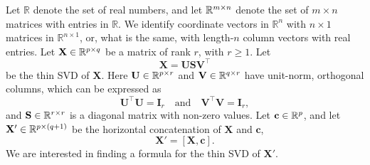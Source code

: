 \documentclass[11pt,a4paper]{article}
\theoremstyle{mybreak}
\numberwithin{dummy}{section}
\theoremstyle{plain}
\theoremstyle{plain}
\theoremstyle{plain}
\theoremstyle{plain}
\theoremstyle{MyNonumberplain}
\newcommand{\0}{\M{0}}
\newcommand{\M}[1]{\mathbf{#1}}
\newcommand{\R}{\mathbb{R}}
\newcommand{\T}{\top}
\newcommand{\ve}[1]{\mathbf{#1}}
\newcommand{\Mat}[2]{%
  \ifthenelse{\equal{#2}{1}}
  {\R^{#1}}
  {\R^{#1 \times #2}}
}
\begin{document}
Let $\R$ denote the set of real numbers, and let $\Mat{m}{n}$ denote the set of $m \times n$ matrices with entries in $\R$.  We identify coordinate vectors in $\R^n$ with $n \times 1$ matrices in $\R^{n \times 1}$, or, what is the same, with length-$n$ column vectors with real entries.  Let $\M{X} \in \Mat{p}{q}$ be a matrix of rank $r$, with $r \geq 1$. Let
\begin{equation}
  \label{eq:1}
  \M{X} = \M{U} \M{S} \M{V}^\T
\end{equation}
be the thin SVD of $\M{X}$.  Here $\M{U} \in \Mat{p}{r}$ and $\M{V} \in \Mat{q}{r}$ have unit-norm, orthogonal columns, which can be expressed as
\begin{displaymath}
  \M{U}^\T \M{U} = \M{I}_r
  \quad
  \text{and}
  \quad
  \M{V}^\T \M{V} = \M{I}_r,
\end{displaymath}
and $\M{S} \in \Mat{r}{r}$ is a diagonal matrix with non-zero values.  Let $\ve{c} \in \Mat{p}{1}$, and let $\M{X}' \in \Mat{p}{(q+1)}$ be the horizontal concatenation of $\M{X}$ and $\ve{c}$,
\begin{displaymath}
  \M{X}' = [\M{X}, \ve{c}].
\end{displaymath}
We are interested in finding a formula for the thin SVD of $\M{X}'$.
\end{document}

